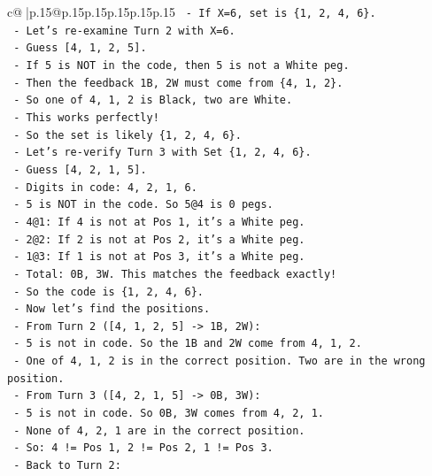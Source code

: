 \documentclass{article}
\begin{document}
{\begin{supertabular}{c@{$\;$}|p{.15\linewidth}@{}p{.15\linewidth}p{.15\linewidth}p{.15\linewidth}p{.15\linewidth}p{.15\linewidth}}
{{{\texttt{    {-} If X=6, set is \{1, 2, 4, 6\}.} \\
\texttt{  {-} Let's re{-}examine Turn 2 with X=6.} \\
\texttt{    {-} Guess {[}4, 1, 2, 5{]}.} \\
\texttt{    {-} If 5 is NOT in the code, then 5 is not a White peg.} \\
\texttt{    {-} Then the feedback 1B, 2W must come from \{4, 1, 2\}.} \\
\texttt{    {-} So one of 4, 1, 2 is Black, two are White.} \\
\texttt{    {-} This works perfectly!} \\
\texttt{    {-} So the set is likely \{1, 2, 4, 6\}.} \\
\texttt{    {-} Let's re{-}verify Turn 3 with Set \{1, 2, 4, 6\}.} \\
\texttt{    {-} Guess {[}4, 2, 1, 5{]}.} \\
\texttt{    {-} Digits in code: 4, 2, 1, 6.} \\
\texttt{    {-} 5 is NOT in the code. So 5@4 is 0 pegs.} \\
\texttt{    {-} 4@1: If 4 is not at Pos 1, it's a White peg.} \\
\texttt{    {-} 2@2: If 2 is not at Pos 2, it's a White peg.} \\
\texttt{    {-} 1@3: If 1 is not at Pos 3, it's a White peg.} \\
\texttt{    {-} Total: 0B, 3W. This matches the feedback exactly!} \\
\texttt{    {-} So the code is \{1, 2, 4, 6\}.} \\
\texttt{    {-} Now let's find the positions.} \\
\texttt{    {-} From Turn 2 ({[}4, 1, 2, 5{]} {-}> 1B, 2W):} \\
\texttt{      {-} 5 is not in code. So the 1B and 2W come from 4, 1, 2.} \\
\texttt{      {-} One of 4, 1, 2 is in the correct position. Two are in the wrong position.} \\
\texttt{    {-} From Turn 3 ({[}4, 2, 1, 5{]} {-}> 0B, 3W):} \\
\texttt{      {-} 5 is not in code. So 0B, 3W comes from 4, 2, 1.} \\
\texttt{      {-} None of 4, 2, 1 are in the correct position.} \\
\texttt{      {-} So: 4 != Pos 1, 2 != Pos 2, 1 != Pos 3.} \\
\texttt{    {-} Back to Turn 2:} \\
}}}
\end{supertabular}}
\end{document}
